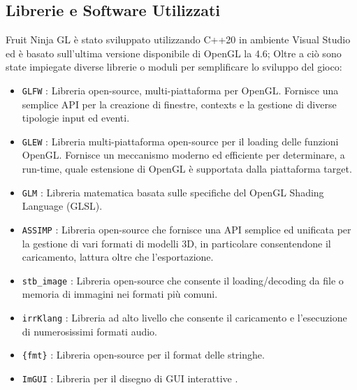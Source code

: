 \subsection{Librerie e Software Utilizzati}
Fruit Ninja GL è stato sviluppato utilizzando C++20 in ambiente Visual Studio ed è basato sull'ultima versione disponibile di OpenGL la 4.6; Oltre a ciò sono state impiegate diverse librerie o moduli per semplificare lo sviluppo del gioco:
\begin{itemize}
\item \texttt{GLFW} \cite{GLFW}: Libreria open-source, multi-piattaforma per OpenGL. Fornisce una semplice API per la creazione di finestre, contexts e la gestione di diverse tipologie input ed eventi.

\item \texttt{GLEW} \cite{GLEW}: Libreria multi-piattaforma open-source per il loading delle funzioni OpenGL. Fornisce un meccanismo moderno ed efficiente per determinare, a run-time, quale estensione di OpenGL è supportata dalla piattaforma target. 

\item \texttt{GLM} \cite{GLM}: Libreria matematica basata sulle specifiche del OpenGL Shading Language (GLSL). 

\item \texttt{ASSIMP} \cite{ASSIMP}: Libreria open-source che fornisce una API semplice ed unificata per la gestione di vari formati di modelli 3D, in particolare consentendone il caricamento, lattura oltre che l'esportazione. 

\item \texttt{stb\_image} \cite{STB}: Libreria open-source che consente il loading/decoding da file o memoria di immagini nei formati più comuni.

\item \texttt{irrKlang} \cite{IRRKLANG}: Libreria ad alto livello che consente il caricamento e l'esecuzione di numerosissimi formati audio.

\item \texttt{\{fmt\}} \cite{FMT}: Libreria open-source per il format delle stringhe. 

\item \texttt{ImGUI} \cite{IMGUI}: Libreria per il disegno di GUI interattive . 
\end{itemize} 

